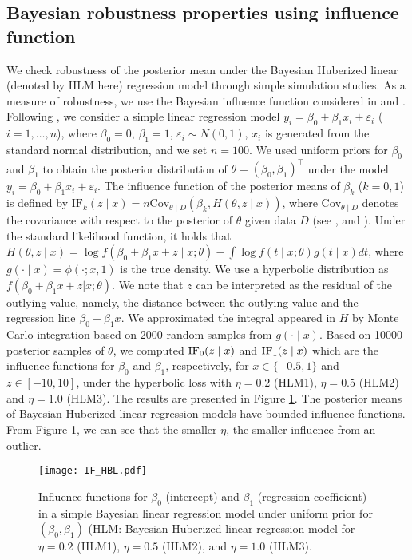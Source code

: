 \documentclass[11pt]{article}
\theoremstyle{plain}
\theoremstyle{definition}
\begin{document}
\subsection{Bayesian robustness properties using influence function}
\label{subsec:4.2}

We check robustness of the posterior mean under the Bayesian Huberized linear (denoted by HLM here) regression model through simple simulation studies. As a measure of robustness, we use the Bayesian influence function considered in \cite{GB16} and \cite{NH20}. Following \cite{HS20}, we consider a simple linear regression model $y_i=\beta_0+\beta_1 x_i+\varepsilon_i$ ($i=1,\dots,n$), where $\beta_0=0$, $\beta_1=1$, $\varepsilon_i\sim N(0,1)$, $x_i$ is generated from the standard normal distribution, and we set $n=100$. We used uniform priors for $\beta_0$ and $\beta_1$ to obtain the posterior distribution of $\theta=(\beta_0,\beta_1)^{\top}$ under the model $y_i=\beta_0+\beta_1 x_i+\varepsilon_i$. The influence function of the posterior means of $\beta_k$ ($k=0,1$) is defined by $\mathrm{IF}_k(z\mid x)=n\mathrm{Cov}_{\theta\mid D}(\beta_k, H(\theta,z\mid x))$, where $\mathrm{Cov}_{\theta\mid D}$ denotes the covariance with respect to the posterior of $\theta$ given data $D$ (see \cite{GB16}, \cite{NH20} and \cite{HS20}).  
Under the standard likelihood function, it holds that $H(\theta, z \mid x)=\log f(\beta_0+\beta_1 x+z \mid x;\theta)-\int \log f(t \mid x;\theta) g(t \mid x)dt$, where $g(\cdot \mid x)=\phi(\cdot; x, 1)$ is the true density. We use a hyperbolic distribution as $f(\beta_0+\beta_1 x+z|x;\theta)$. We note that $z$ can be interpreted as the residual of the outlying value, namely, the distance between the outlying value and the regression line $\beta_0+\beta_1 x$.
We approximated the integral appeared in $H$ by Monte Carlo integration based on 2000 random samples from $g(\cdot \mid x)$. Based on 10000 posterior samples of $\theta$, we computed ${\rm IF}_0(z \mid x)$ and ${\rm IF}_1(z \mid x)$ which are the influence functions for $\beta_0$ and $\beta_1$, respectively, for $x\in \{-0.5, 1\}$ and $z\in [-10, 10]$, under the hyperbolic loss with $\eta=0.2$ (HLM1), $\eta=0.5$ (HLM2) and $\eta=1.0$ (HLM3). The results are presented in Figure \ref{IF_plot}. The posterior means of Bayesian Huberized linear regression models have bounded influence functions. From Figure \ref{IF_plot}, we can see that the smaller $\eta$, the smaller influence from an outlier.

\begin{figure}[htpb]
\centering
\texttt{[image: IF\_HBL.pdf]}
\caption{Influence functions for $\beta_0$ (intercept) and $\beta_1$ (regression coefficient) in a simple Bayesian linear regression model under uniform prior for $(\beta_0,\beta_1)$ (HLM: Bayesian Huberized linear regression model for $\eta=0.2$ (HLM1), $\eta=0.5$ (HLM2), and $\eta=1.0$ (HLM3). }
\label{IF_plot}
\end{figure}
\end{document}
